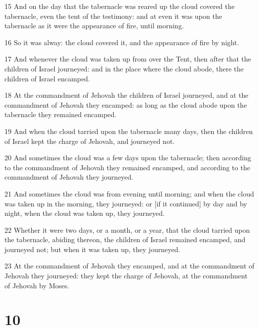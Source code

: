 \par 15 And on the day that the tabernacle was reared up the cloud covered the tabernacle, even the tent of the testimony: and at even it was upon the tabernacle as it were the appearance of fire, until morning.
\par 16 So it was alway: the cloud covered it, and the appearance of fire by night.
\par 17 And whenever the cloud was taken up from over the Tent, then after that the children of Israel journeyed: and in the place where the cloud abode, there the children of Israel encamped.
\par 18 At the commandment of Jehovah the children of Israel journeyed, and at the commandment of Jehovah they encamped: as long as the cloud abode upon the tabernacle they remained encamped.
\par 19 And when the cloud tarried upon the tabernacle many days, then the children of Israel kept the charge of Jehovah, and journeyed not.
\par 20 And sometimes the cloud was a few days upon the tabernacle; then according to the commandment of Jehovah they remained encamped, and according to the commandment of Jehovah they journeyed.
\par 21 And sometimes the cloud was from evening until morning; and when the cloud was taken up in the morning, they journeyed: or [if it continued] by day and by night, when the cloud was taken up, they journeyed.
\par 22 Whether it were two days, or a month, or a year, that the cloud tarried upon the tabernacle, abiding thereon, the children of Israel remained encamped, and journeyed not; but when it was taken up, they journeyed.
\par 23 At the commandment of Jehovah they encamped, and at the commandment of Jehovah they journeyed: they kept the charge of Jehovah, at the commandment of Jehovah by Moses.

\chapter{10}

